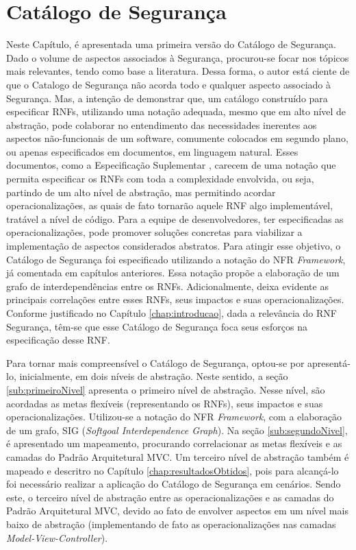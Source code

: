 \chapter{Catálogo de Segurança}
\label{chap:proposta}

Neste Capítulo, é apresentada uma primeira versão do Catálogo de Segurança. Dado o volume de aspectos associados à Segurança, procurou-se focar nos tópicos mais relevantes, tendo como base a literatura. Dessa forma, o autor está ciente de que o Catalogo de Segurança não acorda todo e qualquer aspecto associado à Segurança. Mas, a intenção de demonstrar que, um catálogo construído para especificar RNFs, utilizando uma notação adequada, mesmo que em alto nível de abstração, pode colaborar no entendimento das necessidades inerentes aos aspectos não-funcionais de um software, comumente colocados em segundo plano, ou apenas especificados em documentos, em linguagem natural. Esses documentos, como a Especificação Suplementar \cite{sommerville1997requirements}, carecem de uma notação que permita especificar os RNFs com toda a complexidade envolvida, ou seja, partindo de um alto nível de abstração, mas permitindo acordar operacionalizações, as quais de fato tornarão aquele RNF algo implementável, tratável a nível de código. Para a equipe de desenvolvedores, ter especificadas as operacionalizações, pode promover soluções concretas para viabilizar a implementação de aspectos considerados abstratos. Para atingir esse objetivo, o Catálogo de Segurança foi especificado utilizando a notação do NFR \textit{Framework}, já comentada em capítulos anteriores. Essa notação propõe a elaboração de um grafo de interdependências entre os RNFs. Adicionalmente, deixa evidente as principais correlações entre esses RNFs, seus impactos e suas operacionalizações. Conforme justificado no Capítulo \ref{chap:introducao}, dada a relevância do RNF Segurança, têm-se que esse Catálogo de Segurança foca seus esforços na especificação desse RNF.

Para tornar mais compreensível o Catálogo de Segurança, optou-se por apresentá-lo, inicialmente, em dois níveis de abstração. Neste sentido, a seção \ref{sub:primeiroNivel} apresenta o primeiro nível de abstração. Nesse nível, são acordadas as metas flexíveis (representando os RNFs), seus impactos e suas operacionalizações. Utilizou-se a notação do NFR \textit{Framework}, com a elaboração de um grafo, SIG (\textit{Softgoal Interdependence Graph}). Na seção \ref{sub:segundoNivel}, é apresentado um mapeamento, procurando correlacionar as metas flexíveis e as camadas do Padrão Arquitetural MVC. Um terceiro nível de abstração também é mapeado e descritro no Capítulo \ref{chap:resultadosObtidos}, pois para alcançá-lo foi necessário realizar a aplicação do Catálogo de Segurança em cenários. Sendo este, o terceiro nível de abstração entre as operacionalizações e as camadas do Padrão Arquitetural MVC, devido ao fato de envolver aspectos em um nível mais baixo de abstração (implementando de fato as operacionalizações nas camadas \textit{Model-View-Controller}).

